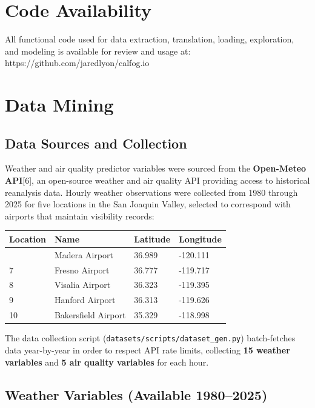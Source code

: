 \documentclass[
  letterpaper,
  DIV=11,
  numbers=noendperiod]{scrartcl}
\begin{document}
\section{Code Availability}\label{code-availability}

All functional code used for data extraction, translation, loading,
exploration, and modeling is available for review and usage at:
https://github.com/jaredlyon/calfog.io

\section{Data Mining}\label{data-mining}

\subsection{Data Sources and
Collection}\label{data-sources-and-collection}

Weather and air quality predictor variables were sourced from the
\textbf{Open-Meteo API}{[}6{]}, an open-source weather and air quality
API providing access to historical reanalysis data. Hourly weather
observations were collected from 1980 through 2025 for five locations in
the San Joaquin Valley, selected to correspond with airports that
maintain visibility records:

\begin{longtable}[]{@{}llll@{}}
\toprule\noalign{}
Location & Name & Latitude & Longitude \\
\midrule\noalign{}
\endhead
\bottomrule\noalign{}
\endlastfoot
6 & Madera Airport & 36.989 & -120.111 \\
7 & Fresno Airport & 36.777 & -119.717 \\
8 & Visalia Airport & 36.323 & -119.395 \\
9 & Hanford Airport & 36.313 & -119.626 \\
10 & Bakersfield Airport & 35.329 & -118.998 \\
\end{longtable}

The data collection script (\texttt{datasets/scripts/dataset\_gen.py})
batch-fetches data year-by-year in order to respect API rate limits,
collecting \textbf{15 weather variables} and \textbf{5 air quality
variables} for each hour.

\subsection{Weather Variables (Available
1980--2025)}\label{weather-variables-available-19802025}
\end{document}
